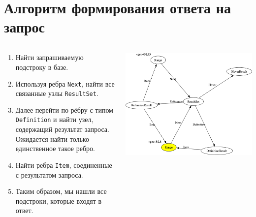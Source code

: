 \documentclass[aspectratio=169,professionalfonts,10pt]{beamer}
\begin{document}
\section{Алгоритм формирования ответа на запрос}
\begin{frame}{\insertsection}

\begin{columns}
    \begin{column}{0.5\textwidth}
        \begin{enumerate}
            \item Найти запрашиваемую подстроку в базе.
            \item Используя ребра \texttt{Next}, найти все связанные узлы \texttt{ResultSet}.
            \item Далее перейти по рёбру с типом \texttt{Definition} и найти узел, содержащий результат запроса. Ожидается найти только единственное такое ребро.
            \item \label{item-definitions} Найти ребра \texttt{Item}, соединенные с результатом запроса.
            \item Таким образом, мы нашли все подстроки, которые входят в ответ.
        \end{enumerate}
    \end{column}
    \begin{column}{0.5\textwidth}
        \includegraphics[width=\textwidth]{figures/lsif.png}
    \end{column}
\end{columns}
\end{frame}
\end{document}
